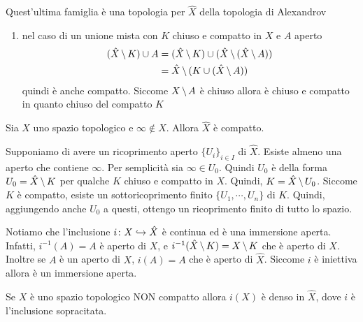\documentclass[a4paper]{article}
\begin{document}
\begin{snippetproposition}{Quest'ultima famiglia è una topologia per \(\hat{X}\) della topologia di Alexandrov}
\begin{enumerate}
\begin{enumerate}
            \item nel caso di un unione mista con \(K\) chiuso e compatto in \(X\)
            e \(A\) aperto
            \begin{align*}
                (\hat{X} \,\backslash\, K) \cup A
                &= (\hat{X} \,\backslash\, K) \cup (\hat{X} \,\backslash\, (\hat{X} \,\backslash\, A)) \\
                &= \hat{X} \,\backslash\, (K \cup (\hat{X} \,\backslash\, A))
            \end{align*}
            quindi è anche compatto.
            Siccome \(X \,\backslash\, A\) è chiuso allora è chiuso e compatto in quanto
            chiuso del compatto \(K\)
        \end{enumerate}
    \end{enumerate}
\end{snippetproposition}

\begin{snippetproposition}{}
    Sia \(X\) uno spazio topologico e \(\infty\notin X\).
    Allora \(\hat{X}\) è compatto.
\end{snippetproposition}

\begin{snippetproof}{}
    Supponiamo di avere un ricoprimento aperto
    \(\{U_i\}_{i\in I}\) di \(\hat{X}\).
    Esiste almeno una aperto che contiene \(\infty\).
    Per semplicità sia \(\infty \in U_0\).
    Quindi \(U_0\) è della forma \(U_0 = \hat{X} \,\backslash\, K\)
    per qualche \(K\) chiuso e compatto in \(X\).
    Quindi, \(K = \hat{X} \,\backslash\, U_0\).
    Siccome \(K\) è compatto, esiste un sottoricoprimento finito
    \(\{U_1, \cdots, U_n\}\) di \(K\).
    Quindi, aggiungendo anche \(U_0\) a questi, ottengo un ricoprimento finito di tutto lo spazio.
\end{snippetproof}

Notiamo che l'inclusione \(i \colon X \hookrightarrow \hat{X}\)
è continua ed è una immersione aperta.
Infatti, \(i^{-1}(A) = A\) è aperto di \(X\),
e \(i^{-1}(\hat{X} \,\backslash\, K) = X \,\backslash\, K\)
che è aperto di \(X\).
Inoltre se \(A\) è un aperto di \(X\), \(i(A) = A\) che è aperto di \(\hat{X}\).
Siccome \(i\) è iniettiva allora è un immersione aperta.

\begin{snippetproposition}{}
    Se \(X\) è uno spazio topologico NON compatto
    allora \(i(X)\) è denso in \(\hat{X}\),
    dove \(i\) è l'inclusione sopracitata.
\end{snippetproposition}
\end{document}
